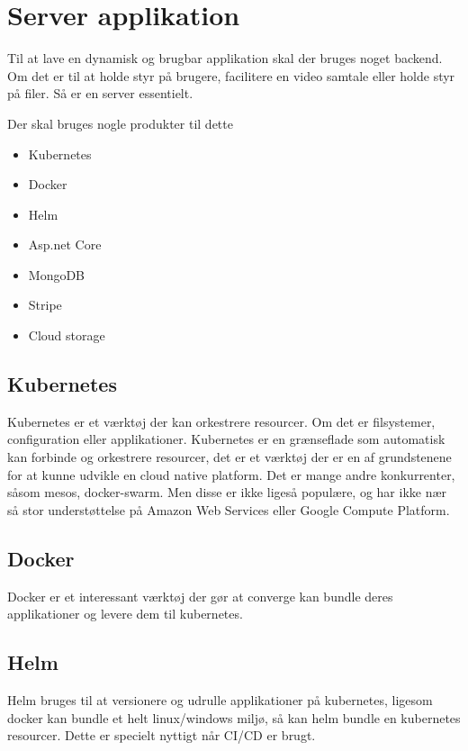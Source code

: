 \section{Server applikation}

Til at lave en dynamisk og brugbar applikation skal der bruges noget backend. Om det er til at holde styr på brugere, facilitere en video samtale eller holde styr på filer. Så er en server essentielt.

Der skal bruges nogle produkter til dette

\begin{itemize}
    \item Kubernetes
    \item Docker
    \item Helm
    \item Asp.net Core
    \item MongoDB
    \item Stripe
    \item Cloud storage
\end{itemize}

\subsection{Kubernetes}

Kubernetes er et værktøj der kan orkestrere resourcer. Om det er filsystemer, configuration eller applikationer. Kubernetes er en grænseflade som automatisk kan forbinde og orkestrere resourcer, det er et værktøj der er en af grundstenene for at kunne udvikle en cloud native platform. Det er mange andre konkurrenter, såsom mesos, docker-swarm. Men disse er ikke ligeså populære, og har ikke nær så stor understøttelse på Amazon Web Services eller Google Compute Platform.

\subsection{Docker}

Docker er et interessant værktøj der gør at converge kan bundle deres applikationer og levere dem til kubernetes.

\subsection{Helm}

Helm bruges til at versionere og udrulle applikationer på kubernetes, ligesom docker kan bundle et helt linux/windows miljø, så kan helm bundle en kubernetes resourcer. Dette er specielt nyttigt når CI/CD er brugt.

